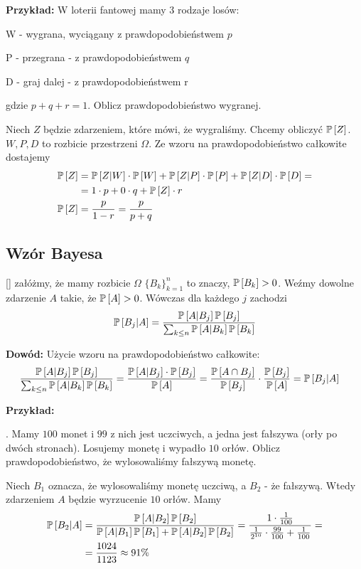 \proofend

\textbf{Przykład:} W loterii fantowej mamy $3$ rodzaje losów:

\indent \point W - wygrana, wyciągany z prawdopodobieństwem $p$

\indent \point P - przegrana - z prawdopodobieństwem $q$

\indent \point D - graj dalej - z prawdopodobieństwem r

gdzie $p+q+r=1$. Oblicz prawdopodobieństwo wygranej. 

Niech $Z$ będzie zdarzeniem, które mówi, że wygraliśmy. Chcemy obliczyć $\mathbb{P}\left[Z\right]$. $W, P, D$ to rozbicie przestrzeni $\Omega$. Ze wzoru na prawdopodobieństwo całkowite dostajemy
\begin{align*}
    \mathbb{P}\left[Z\right]&=\mathbb{P}\left[Z|W\right]\cdot\mathbb{P}\left[W\right]+\mathbb{P}\left[Z|P\right]\cdot\mathbb{P}\left[P\right]+\mathbb{P}\left[Z|D\right]\cdot\mathbb{P}\left[D\right]=\\
    &=1\cdot p+0\cdot q+\mathbb{P}\left[Z\right]\cdot r\\
    \mathbb{P}\left[Z\right]&={p\over 1-r}={p\over p+q}
\end{align*}

\subsection{Wzór Bayesa}

 [] załóżmy, że mamy rozbicie $\Omega$ $\{B_k\}_{k=1}^n$ to znaczy, $\mathbb{P}\left[B_k\right]>0$. Weźmy dowolne zdarzenie $A$ takie, że $\mathbb{P}\left[A\right]>0$. Wówczas dla każdego $j$ zachodzi
$$\mathbb{P}\left[B_j|A\right]={\mathbb{P}\left[A|B_j\right]\mathbb{P}\left[B_j\right]\over \sum_{k\leq n}\mathbb{P}\left[A|B_k\right]\mathbb{P}\left[B_k\right]}$$

\textbf{Dowód:} Użycie wzoru na prawdopodobieństwo całkowite:
\begin{align*}
    {\mathbb{P}\left[A|B_j\right]\mathbb{P}\left[B_j\right]\over \sum_{k\leq n}\mathbb{P}\left[A|B_k\right]\mathbb{P}\left[B_k\right]}&={\mathbb{P}\left[A|B_j\right]\cdot\mathbb{P}\left[B_j\right]\over \mathbb{P}\left[A\right]}={\mathbb{P}\left[A\cap B_j\right]\over\mathbb{P}\left[B_j\right]}\cdot{\mathbb{P}\left[B_j\right]\over\mathbb{P}\left[A\right]}=\mathbb{P}\left[B_j|A\right]
\end{align*}

\proofend

\textbf{Przykład:} 

. Mamy $100$ monet i $99$ z nich jest uczciwych, a jedna jest fałszywa (orły po dwóch stronach). Losujemy monetę i wypadło $10$ orłów. Oblicz prawdopodobieństwo, że wylosowaliśmy fałszywą monetę.

Niech $B_1$ oznacza, że wylosowaliśmy monetę uczciwą, a $B_2$ - że fałszywą. Wtedy zdarzeniem $A$ będzie wyrzucenie $10$ orłów. Mamy
\begin{align*}
    \mathbb{P}\left[B_2|A\right]&={\mathbb{P}\left[A|B_2\right]\mathbb{P}\left[B_2\right]\over\mathbb{P}\left[A|B_1\right]\mathbb{P}\left[B_1\right]+\mathbb{P}\left[A|B_2\right]\mathbb{P}\left[B_2\right]}={1\cdot\frac1{100}\over{1\over2^{10}}\cdot{99\over100}+\frac1{100}}=\\
    &={1024\over1123}\approx91\%
\end{align*}

